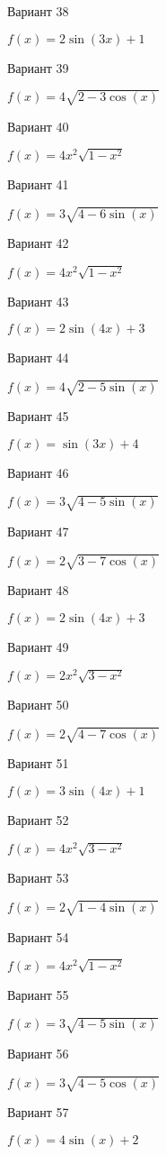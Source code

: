 \documentclass[11pt]{report}
\begin{document}
Вариант 38

$f(x) = 2 \sin{\left(3 x \right)} + 1$

Вариант 39

$f(x) = 4 \sqrt{2 - 3 \cos{\left(x \right)}}$

Вариант 40

$f(x) = 4 x^{2} \sqrt{1 - x^{2}}$

Вариант 41

$f(x) = 3 \sqrt{4 - 6 \sin{\left(x \right)}}$

Вариант 42

$f(x) = 4 x^{2} \sqrt{1 - x^{2}}$

Вариант 43

$f(x) = 2 \sin{\left(4 x \right)} + 3$

Вариант 44

$f(x) = 4 \sqrt{2 - 5 \sin{\left(x \right)}}$

Вариант 45

$f(x) = \sin{\left(3 x \right)} + 4$

Вариант 46

$f(x) = 3 \sqrt{4 - 5 \sin{\left(x \right)}}$

Вариант 47

$f(x) = 2 \sqrt{3 - 7 \cos{\left(x \right)}}$

Вариант 48

$f(x) = 2 \sin{\left(4 x \right)} + 3$

Вариант 49

$f(x) = 2 x^{2} \sqrt{3 - x^{2}}$

Вариант 50

$f(x) = 2 \sqrt{4 - 7 \cos{\left(x \right)}}$

Вариант 51

$f(x) = 3 \sin{\left(4 x \right)} + 1$

Вариант 52

$f(x) = 4 x^{2} \sqrt{3 - x^{2}}$

Вариант 53

$f(x) = 2 \sqrt{1 - 4 \sin{\left(x \right)}}$

Вариант 54

$f(x) = 4 x^{2} \sqrt{1 - x^{2}}$

Вариант 55

$f(x) = 3 \sqrt{4 - 5 \sin{\left(x \right)}}$

Вариант 56

$f(x) = 3 \sqrt{4 - 5 \cos{\left(x \right)}}$

Вариант 57

$f(x) = 4 \sin{\left(x \right)} + 2$
\end{document}
